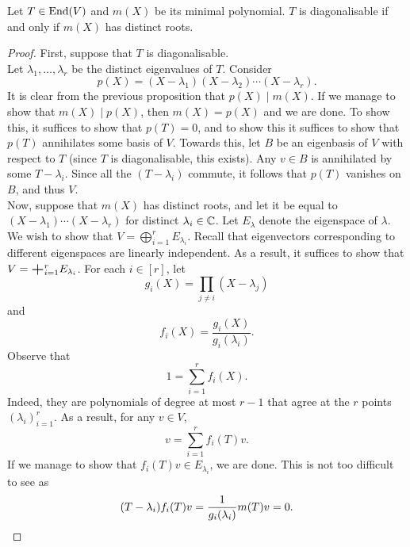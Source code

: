 		\begin{ftheo}
			\label{diagonalisable iff min poly has distinct roots}
			Let $T \in \operatorname{End}(V)$ and $m(X)$ be its minimal polynomial. $T$ is diagonalisable if and only if $m(X)$ has distinct roots.
		\end{ftheo}
		\begin{proof}
			First, suppose that $T$ is diagonalisable.\\
			Let $\lambda_1,\ldots,\lambda_r$ be the distinct eigenvalues of $T$. Consider
			\[ p(X) = (X - \lambda_1) (X - \lambda_2) \cdots (X - \lambda_r). \]
			It is clear from the previous proposition that $p(X) \mid m(X)$. If we manage to show that $m(X) \mid p(X)$, then $m(X) = p(X)$ and we are done. To show this, it suffices to show that $p(T) = 0$, and to show this it suffices to show that $p(T)$ annihilates some basis of $V$. Towards this, let $B$ be an eigenbasis of $V$ with respect to $T$ (since $T$ is diagonalisable, this exists). Any $v \in B$ is annihilated by some $T - \lambda_i$. Since all the $(T-\lambda_i)$ commute, it follows that $p(T)$ vanishes on $B$, and thus $V$.\\

			Now, suppose that $m(X)$ has distinct roots, and let it be equal to $(X-\lambda_1) \cdots (X-\lambda_r)$ for distinct $\lambda_i \in \mathbb{C}$. Let $E_\lambda$ denote the eigenspace of $\lambda$. We wish to show that $V = \bigoplus_{i=1}^r E_{\lambda_i}$. Recall that eigenvectors corresponding to different eigenspaces are linearly independent. As a result, it suffices to show that $V = \bigplus_{i=1}^r E_{\lambda_i}$. For each $i \in [r]$, let
			\[ g_i(X) = \prod_{j \ne i} (X - \lambda_j) \]
			and
			\[ f_i(X) = \frac{g_i(X)}{g_i(\lambda_i)}. \]
			Observe that
			\[ 1 = \sum_{i=1}^r f_i(X). \]
			Indeed, they are polynomials of degree at most $r-1$ that agree at the $r$ points $(\lambda_i)_{i=1}^r$. As a result, for any $v \in V$,
			\[ v = \sum_{i=1}^r f_i(T)v. \]
			If we manage to show that $f_i(T)v \in E_{\lambda_i}$, we are done.
			This is not too difficult to see as
			\[ (T - \lambda_i) f_i(T)v = \frac{1}{g_i(\lambda_i)} m(T) v = 0. \qedhere \]
		\end{proof}

\clearpage
